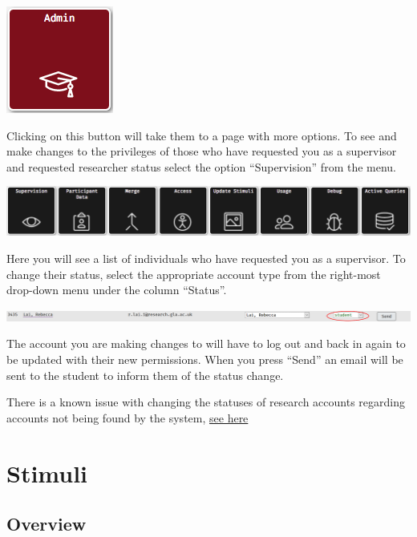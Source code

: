 \documentclass[]{book}
\begin{document}
\includegraphics{images/screenshots/admin_button.png}

Clicking on this button will take them to a page with more options. To see and make changes to the privileges of those who have requested you as a supervisor and requested researcher status select the option ``Supervision'' from the menu.

\includegraphics{images/screenshots/admin_options.png}

Here you will see a list of individuals who have requested you as a supervisor. To change their status, select the appropriate account type from the right-most drop-down menu under the column ``Status''.

\includegraphics{images/screenshots/status_bar.png}

The account you are making changes to will have to log out and back in again to be updated with their new permissions. When you press ``Send'' an email will be sent to the student to inform them of the status change.

\begin{bug}
There is a known issue with changing the statuses of research accounts
regarding accounts not being found by the system,
\protect\hyperlink{notfound}{see here}
\end{bug}

\hypertarget{stimuli}{%
\chapter{Stimuli}\label{stimuli}}

\hypertarget{overview-1}{%
\section{Overview}\label{overview-1}}
\end{document}
